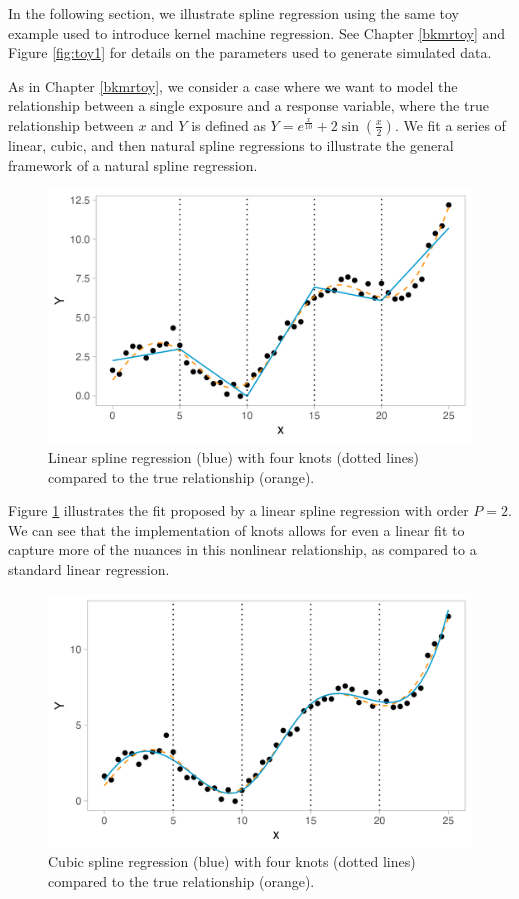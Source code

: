 \documentclass[12pt, twoside]{amherstthesis}
\begin{document}
In the following section, we illustrate spline regression using the same toy example used to introduce kernel machine regression. See Chapter \ref{bkmrtoy} and Figure \ref{fig:toy1} for details on the parameters used to generate simulated data.

As in Chapter \ref{bkmrtoy}, we consider a case where we want to model the relationship between a single exposure and a response variable, where the true relationship between \(x\) and \(Y\) is defined as \(Y = e^{\frac{x}{10}} + 2\sin(\frac{x}{2})\). We fit a series of linear, cubic, and then natural spline regressions to illustrate the general framework of a natural spline regression.
\begin{figure}

{\centering \includegraphics[width=0.75\linewidth]{figures/ch3_toy4} 

}

\caption{Linear spline regression (blue) with four knots (dotted lines) compared to the true relationship (orange).}\label{fig:toy4}
\end{figure}
Figure \ref{fig:toy4} illustrates the fit proposed by a linear spline regression with order \(P=2\). We can see that the implementation of knots allows for even a linear fit to capture more of the nuances in this nonlinear relationship, as compared to a standard linear regression.
\begin{figure}

{\centering \includegraphics[width=0.75\linewidth]{figures/ch3_toy5} 

}

\caption{Cubic spline regression (blue) with four knots (dotted lines) compared to the true relationship (orange).}\label{fig:toy5}
\end{figure}
\end{document}
